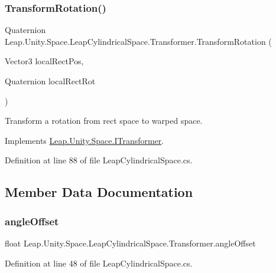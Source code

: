 \subsubsection{\texorpdfstring{TransformRotation()}{TransformRotation()}}
{\footnotesize\ttfamily Quaternion Leap.\+Unity.\+Space.\+Leap\+Cylindrical\+Space.\+Transformer.\+Transform\+Rotation (\begin{DoxyParamCaption}\item[{Vector3}]{local\+Rect\+Pos,  }\item[{Quaternion}]{local\+Rect\+Rot }\end{DoxyParamCaption})}



Transform a rotation from rect space to warped space. 



Implements \mbox{\hyperlink{interface_leap_1_1_unity_1_1_space_1_1_i_transformer_a69931f79b1e951cf38f1b3855e02ba91}{Leap.\+Unity.\+Space.\+I\+Transformer}}.



Definition at line 88 of file Leap\+Cylindrical\+Space.\+cs.



\subsection{Member Data Documentation}
\mbox{\label{class_leap_1_1_unity_1_1_space_1_1_leap_cylindrical_space_1_1_transformer_a2aaf4113a6fd898b782a533219d3d8b0}} 
\subsubsection{\texorpdfstring{angleOffset}{angleOffset}}
{\footnotesize\ttfamily float Leap.\+Unity.\+Space.\+Leap\+Cylindrical\+Space.\+Transformer.\+angle\+Offset}



Definition at line 48 of file Leap\+Cylindrical\+Space.\+cs.

\mbox{\label{class_leap_1_1_unity_1_1_space_1_1_leap_cylindrical_space_1_1_transformer_a713b656dee217115df25fb7cbf2f5024}} 

